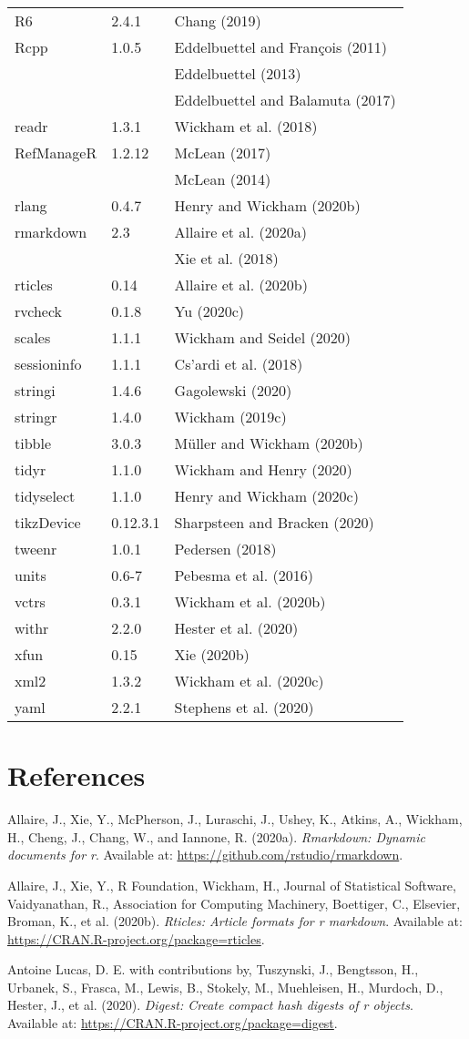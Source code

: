 \documentclass[utf8]{frontiersSCNS}
\begin{document}
\begin{longtable}[]{@{}lll@{}}
R6 & 2.4.1 & Chang (2019)\tabularnewline
Rcpp & 1.0.5 & Eddelbuettel and François (2011)\tabularnewline
& & Eddelbuettel (2013)\tabularnewline
& & Eddelbuettel and Balamuta (2017)\tabularnewline
readr & 1.3.1 & Wickham et al. (2018)\tabularnewline
RefManageR & 1.2.12 & McLean (2017)\tabularnewline
& & McLean (2014)\tabularnewline
rlang & 0.4.7 & Henry and Wickham (2020b)\tabularnewline
rmarkdown & 2.3 & Allaire et al. (2020a)\tabularnewline
& & Xie et al. (2018)\tabularnewline
rticles & 0.14 & Allaire et al. (2020b)\tabularnewline
rvcheck & 0.1.8 & Yu (2020c)\tabularnewline
scales & 1.1.1 & Wickham and Seidel (2020)\tabularnewline
sessioninfo & 1.1.1 & Cs\a'ardi et al. (2018)\tabularnewline
stringi & 1.4.6 & Gagolewski (2020)\tabularnewline
stringr & 1.4.0 & Wickham (2019c)\tabularnewline
tibble & 3.0.3 & Müller and Wickham (2020b)\tabularnewline
tidyr & 1.1.0 & Wickham and Henry (2020)\tabularnewline
tidyselect & 1.1.0 & Henry and Wickham (2020c)\tabularnewline
tikzDevice & 0.12.3.1 & Sharpsteen and Bracken (2020)\tabularnewline
tweenr & 1.0.1 & Pedersen (2018)\tabularnewline
units & 0.6-7 & Pebesma et al. (2016)\tabularnewline
vctrs & 0.3.1 & Wickham et al. (2020b)\tabularnewline
withr & 2.2.0 & Hester et al. (2020)\tabularnewline
xfun & 0.15 & Xie (2020b)\tabularnewline
xml2 & 1.3.2 & Wickham et al. (2020c)\tabularnewline
yaml & 2.2.1 & Stephens et al. (2020)\tabularnewline
\bottomrule
\end{longtable}

\hypertarget{references}{%
\section*{References}\label{references}}

\hypertarget{refs}{}
\leavevmode\hypertarget{ref-allaire2020rmarkdown}{}%
Allaire, J., Xie, Y., McPherson, J., Luraschi, J., Ushey, K., Atkins,
A., Wickham, H., Cheng, J., Chang, W., and Iannone, R. (2020a).
\emph{Rmarkdown: Dynamic documents for r}. Available at:
\url{https://github.com/rstudio/rmarkdown}.

\leavevmode\hypertarget{ref-allaire2020rticles}{}%
Allaire, J., Xie, Y., R Foundation, Wickham, H., Journal of Statistical
Software, Vaidyanathan, R., Association for Computing Machinery,
Boettiger, C., Elsevier, Broman, K., et al. (2020b). \emph{Rticles:
Article formats for r markdown}. Available at:
\url{https://CRAN.R-project.org/package=rticles}.

\leavevmode\hypertarget{ref-lucas2020digest}{}%
Antoine Lucas, D. E. with contributions by, Tuszynski, J., Bengtsson,
H., Urbanek, S., Frasca, M., Lewis, B., Stokely, M., Muehleisen, H.,
Murdoch, D., Hester, J., et al. (2020). \emph{Digest: Create compact
hash digests of r objects}. Available at:
\url{https://CRAN.R-project.org/package=digest}.
\end{document}
